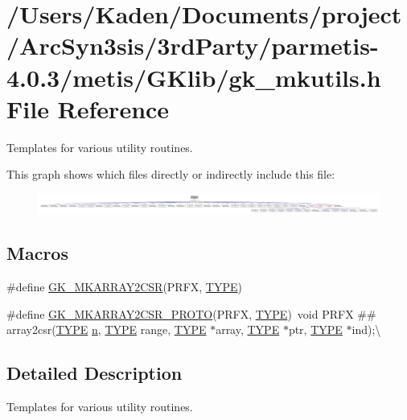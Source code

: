 \hypertarget{a00074}{}\section{/\+Users/\+Kaden/\+Documents/project/\+Arc\+Syn3sis/3rd\+Party/parmetis-\/4.0.3/metis/\+G\+Klib/gk\+\_\+mkutils.h File Reference}
\label{a00074}


Templates for various utility routines.  


This graph shows which files directly or indirectly include this file\+:\nopagebreak
\begin{figure}[H]
\begin{center}
\leavevmode
\includegraphics[width=350pt]{a00076}
\end{center}
\end{figure}
\subsection*{Macros}
\begin{DoxyCompactItemize}
\item 
\#define \hyperlink{a00074_ab124cab2d7d1be838a8727b42ac7d44e}{G\+K\+\_\+\+M\+K\+A\+R\+R\+A\+Y2\+C\+SR}(P\+R\+FX,  \hyperlink{a00608_a0bc6723d5d4776ab7cdc646728b775f7}{T\+Y\+PE})
\item 
\#define \hyperlink{a00074_a3639070206506cda0f6879678f5a2dcd}{G\+K\+\_\+\+M\+K\+A\+R\+R\+A\+Y2\+C\+S\+R\+\_\+\+P\+R\+O\+TO}(P\+R\+FX,  \hyperlink{a00608_a0bc6723d5d4776ab7cdc646728b775f7}{T\+Y\+PE})~void P\+R\+FX \#\# array2csr(\hyperlink{a00608_a0bc6723d5d4776ab7cdc646728b775f7}{T\+Y\+PE} \hyperlink{a00623_a781a04ab095280f838ff3eb0e51312e0}{n}, \hyperlink{a00608_a0bc6723d5d4776ab7cdc646728b775f7}{T\+Y\+PE} range, \hyperlink{a00608_a0bc6723d5d4776ab7cdc646728b775f7}{T\+Y\+PE} $\ast$array, \hyperlink{a00608_a0bc6723d5d4776ab7cdc646728b775f7}{T\+Y\+PE} $\ast$ptr, \hyperlink{a00608_a0bc6723d5d4776ab7cdc646728b775f7}{T\+Y\+PE} $\ast$ind);\textbackslash{}
\end{DoxyCompactItemize}


\subsection{Detailed Description}
Templates for various utility routines. 

